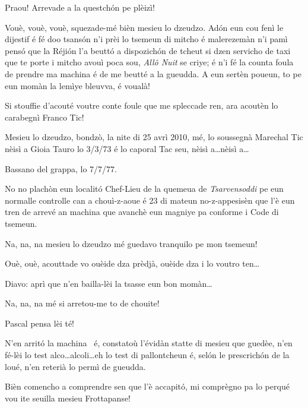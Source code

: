 \begin{drama}
\DzeudzoSenliquerspeaks Praou! Arrevade a la questchón pe plèizì!

\Cienspeaks Vouè, vouè, vouè, squezade-mé bièn mesieu lo dzeudzo. Adón eun cou fenì le dijestif é fé doo tsansón n’i prèi lo tsemeun di mitcho é malerezemàn n’i pamì pensó que la Réjión l’a beuttó a dispozichón de tcheut si dzen servicho de taxi que te porte i mitcho avouì poca sou, \textit{Allô Nuit} se criye; é n’i fé la counta foula de prendre ma machina é de me beutté a la gueudda. A eun sertèn poueun, to pe eun momàn la lemìye bleuvva, é voualà!

\DzeudzoSenliquerspeaks  Si stouffie d'acouté voutre conte foule que me spleccade ren, ara acoutèn lo carabegnì Franco Tic!


\Ticspeaks Mesieu lo dzeudzo, bondzò, la nite di 25 avrì 2010, mé, lo soussegnà Marechal Tic nèisì a Gioia Tauro lo 3/3/73 é lo caporal Tac seu, nèisì a\ldots nèisì a\ldots

\Tacspeaks Bassano del grappa,  lo 7/7/77.

\Ticspeaks  No no plachòn eun localitó Chef-Lieu de la quemeua de \textit{Tsarvensoddi} pe eun normalle controlle can a chouì-z-aoue é 23 di mateun no-z-appesisèn que l’è eun tren de arrevé an machina que avanchè eun magniye pa conforme i Code di tsemeun. 

\Cienspeaks Na, na, na mesieu lo dzeudzo mé guedavo tranquilo pe mon tsemeun!

\DzeudzoSenliquerspeaks {}  Ouè, ouè, acouttade vo ouèide dza prèdjà, ouèide dza i lo voutro ten\ldots

\Ticspeaks Diavo: aprì que n’en bailla-lèi la tsasse eun bon momàn\ldots

\Cienspeaks Na, na, na mé si arretou-me to de chouite!

\DzeudzoSenliquerspeaks {}  Pascal pensa lèi té!


\Ticspeaks N’en arritó la machina \machina\ é, constatoù l’évidàn statte di mesieu que guedèe, n’en fé-lèi lo test alco\ldots alcoli\ldots eh lo test di pallontcheun é, selón le prescrichón de la loué, n’en reterià lo permì de gueudda.

\DzeudzoSenliquerspeaks Bièn comencho a comprendre sen que l'è accapitó, mi comprègno pa lo perqué vou ite seuilla mesieu Frottapanse!


\end{drama}
